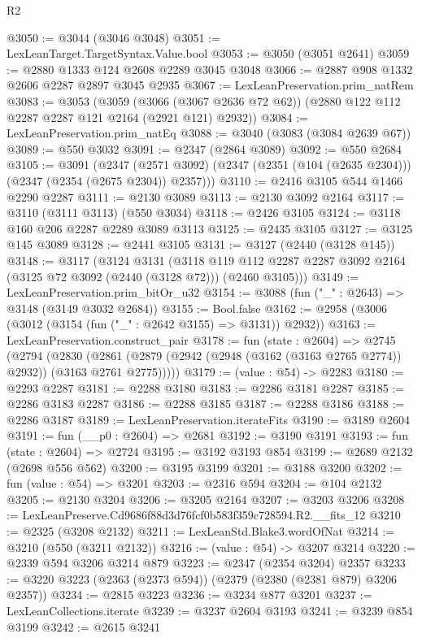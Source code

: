 \begin{lexlean}{R2}
\begin{coremodule}
@3050 := @3044 (@3046 @3048)
@3051 := LexLeanTarget.TargetSyntax.Value.bool
@3053 := @3050 (@3051 @2641)
@3059 := @2880 @1333 @124 @2608 @2289 @3045 @3048
@3066 := @2887 @908 @1332 @2606 @2287 @2897 @3045 @2935
@3067 := LexLeanPreservation.prim_natRem
@3083 := @3053
    (@3059
      (@3066 (@3067 @2636 @72 @62))
      (@2880 @122 @112 @2287 @2287 @121 @2164 (@2921 @121) @2932))
@3084 := LexLeanPreservation.prim_natEq
@3088 := @3040 (@3083 (@3084 @2639 @67))
@3089 := @550 @3032
@3091 := @2347 (@2864 @3089)
@3092 := @550 @2684
@3105 := @3091
    (@2347 (@2571 @3092) (@2347 (@2351 (@104 (@2635 @2304))) (@2347 (@2354 (@2675 @2304)) @2357)))
@3110 := @2416 @3105 @544 @1466 @2290 @2287
@3111 := @2130 @3089
@3113 := @2130 @3092 @2164
@3117 := @3110 (@3111 @3113) (@550 @3034)
@3118 := @2426 @3105
@3124 := @3118 @160 @206 @2287 @2289 @3089 @3113
@3125 := @2435 @3105
@3127 := @3125 @145 @3089
@3128 := @2441 @3105
@3131 := @3127 (@2440 (@3128 @145))
@3148 := @3117
    (@3124
      @3131
      (@3118 @119 @112 @2287 @2287 @3092 @2164 (@3125 @72 @3092 (@2440 (@3128 @72))) (@2460 @3105)))
@3149 := LexLeanPreservation.prim_bitOr_u32
@3154 := @3088 (fun ("_" : @2643) => @3148 (@3149 @3032 @2684))
@3155 := Bool.false
@3162 := @2958 (@3006 (@3012 (@3154 (fun ("_" : @2642 @3155) => @3131)) @2932))
@3163 := LexLeanPreservation.construct_pair
@3178 := fun (state : @2604) =>
  @2745
    (@2794
      (@2830 (@2861 (@2879 (@2942 (@2948 (@3162 (@3163 @2765 @2774)) @2932)) (@3163 @2761 @2775)))))
@3179 := (value : @54) -> @2283
@3180 := @2293 @2287
@3181 := @2288 @3180
@3183 := @2286 @3181 @2287
@3185 := @2286 @3183 @2287
@3186 := @2288 @3185
@3187 := @2288 @3186
@3188 := @2286 @3187
@3189 := LexLeanPreservation.iterateFits
@3190 := @3189 @2604
@3191 := fun (__p0 : @2604) => @2681
@3192 := @3190 @3191
@3193 := fun (state : @2604) => @2724
@3195 := @3192 @3193 @854
@3199 := @2689 @2132 (@2698 @556 @562)
@3200 := @3195 @3199
@3201 := @3188 @3200
@3202 := fun (value : @54) => @3201
@3203 := @2316 @594
@3204 := @104 @2132
@3205 := @2130 @3204
@3206 := @3205 @2164
@3207 := @3203 @3206
@3208 := LexLeanPreserve.Cd9686f88d3d76fcf0b583f359c728594.R2.__fits_12
@3210 := @2325 (@3208 @2132)
@3211 := LexLeanStd.Blake3.wordOfNat
@3214 := @3210 (@550 (@3211 @2132))
@3216 := (value : @54) -> @3207 @3214
@3220 := @2339 @594 @3206 @3214 @879
@3223 := @2347 (@2354 @3204) @2357
@3233 := @3220 @3223 (@2363 (@2373 @594)) (@2379 (@2380 (@2381 @879) @3206 @2357))
@3234 := @2815 @3223
@3236 := @3234 @877 @3201
@3237 := LexLeanCollections.iterate
@3239 := @3237 @2604 @3193
@3241 := @3239 @854 @3199
@3242 := @2615 @3241

\end{coremodule}
\end{lexlean}

